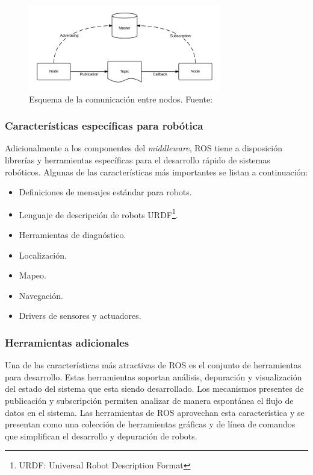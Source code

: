         \begin{figure}[!h] 
            \centering
            \includegraphics[width=0.75\textwidth]{img/rosnodos}
            \caption[Esquema de la comunicación entre nodos]{Esquema de la comunicación entre nodos. Fuente: \cite{roswiki} }
            \label{fig:rosnodos}
        \end{figure}

        \subsubsection{Características específicas para robótica}
        Adicionalmente a los componentes del \textit{middleware}, ROS tiene a disposición librerías y herramientas específicas 
        para el desarrollo rápido de sistemas robóticos. Algunas de las características más importantes se listan a continuación:

        \begin{itemize}
            \item Definiciones de mensajes estándar para robots.
            \item Lenguaje de descripción de robots URDF\footnote{URDF: Universal Robot Description Format}.
            \item Herramientas de diagnóstico.
            \item Localización.
            \item Mapeo.
            \item Navegación.
            \item Drivers de sensores y actuadores.
        \end{itemize}

        \subsubsection{Herramientas adicionales}
        Una de las características más atractivas de ROS es el conjunto de herramientas para desarrollo. Estas herramientas 
        soportan análisis, depuración y visualización del estado del sistema que esta siendo desarrollado. Los mecanismos presentes
        de publicación y subscripción permiten analizar de manera espontánea el flujo de datos en el sistema. Las herramientas 
        de ROS aprovechan esta característica y se presentan como una colección de herramientas gráficas y de línea de comandos que 
        simplifican el desarrollo y depuración de robots.

